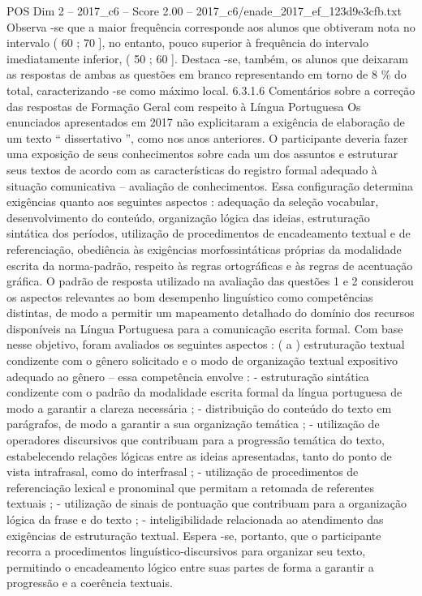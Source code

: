\begin{textsample}{POS Dim 2 – 2017\_c6 – Score 2.00 – 2017\_c6/enade\_2017\_ef\_123d9e3cfb.txt}
Observa -se que a maior frequência corresponde aos alunos que obtiveram nota no intervalo ( 60 ; 70 ], no entanto, pouco superior à frequência do intervalo imediatamente inferior, ( 50 ; 60 ].
Destaca -se, também, os alunos que deixaram as respostas de ambas as questões em branco representando em torno de 8 \% do total, caracterizando -se como máximo local. 6.3.1.6 Comentários sobre a correção das respostas de Formação Geral com respeito à Língua Portuguesa Os enunciados apresentados em 2017 não explicitaram a exigência de elaboração de um texto “ dissertativo ”, como nos anos anteriores.
O participante deveria fazer uma exposição de seus conhecimentos sobre cada um dos assuntos e estruturar seus textos de acordo com as características do registro formal adequado à situação comunicativa – avaliação de conhecimentos.
Essa configuração determina exigências quanto aos seguintes aspectos : adequação da seleção vocabular, desenvolvimento do conteúdo, organização lógica das ideias, estruturação sintática dos períodos, utilização de procedimentos de encadeamento textual e de referenciação, obediência às exigências morfossintáticas próprias da modalidade escrita da norma-padrão, respeito às regras ortográficas e às regras de acentuação gráfica.
O padrão de resposta utilizado na avaliação das questões 1 e 2 considerou os aspectos relevantes ao bom desempenho linguístico como competências distintas, de modo a permitir um mapeamento detalhado do domínio dos recursos disponíveis na Língua Portuguesa para a comunicação escrita formal.
Com base nesse objetivo, foram avaliados os seguintes aspectos : ( a ) estruturação textual condizente com o gênero solicitado e o modo de organização textual expositivo adequado ao gênero – essa competência envolve : - estruturação sintática condizente com o padrão da modalidade escrita formal da língua portuguesa de modo a garantir a clareza necessária ; - distribuição do conteúdo do texto em parágrafos, de modo a garantir a sua organização temática ; - utilização de operadores discursivos que contribuam para a progressão temática do texto, estabelecendo relações lógicas entre as ideias apresentadas, tanto do ponto de vista intrafrasal, como do interfrasal ; - utilização de procedimentos de referenciação lexical e pronominal que permitam a retomada de referentes textuais ; - utilização de sinais de pontuação que contribuam para a organização lógica da frase e do texto ; - inteligibilidade relacionada ao atendimento das exigências de estruturação textual.
Espera -se, portanto, que o participante recorra a procedimentos linguístico-discursivos para organizar seu texto, permitindo o encadeamento lógico entre suas partes de forma a garantir a progressão e a coerência textuais.

\end{textsample}
